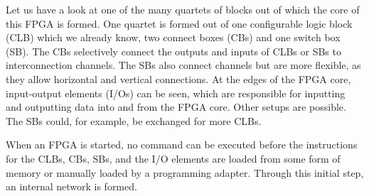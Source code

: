Let us have a look at one of the many quartets of
blocks out of which the core of this FPGA is formed.
One quartet is formed out of one configurable logic block
(CLB) which we already know, two connect boxes (CBs) and
one switch box (SB). The CBs selectively
connect the outputs and inputs of CLBs or SBs to interconnection
channels. The SBs also connect channels
but are more flexible, as they allow horizontal and
vertical connections. At the edges of the FPGA core,
input-output elements (I/Os) can be seen, which are
responsible for inputting and outputting data
into and from the FPGA core.
Other setups are possible. The SBs could, for example,
be exchanged for more CLBs.

When an FPGA is started, no command can be executed
before the instructions for the CLBs, CBs, SBs, and
the I/O elements are loaded from some form of memory
or manually loaded by a programming adapter.
Through this initial step, an internal network is
formed.
